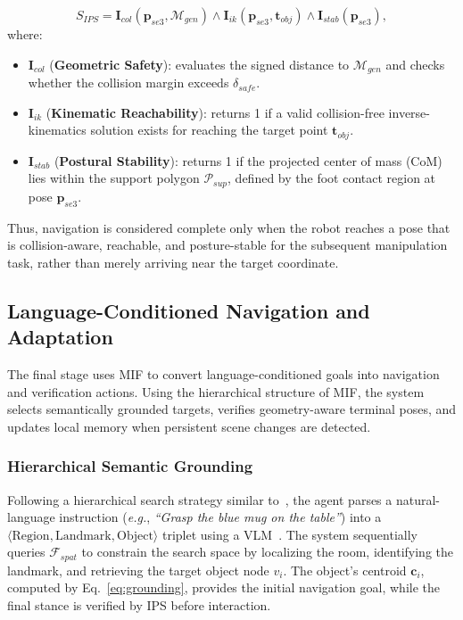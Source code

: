 \documentclass[conference]{IEEEtran}
\begin{document}
\begin{equation}
    S_{IPS} = \mathbf{I}_{col}(\mathbf{p}_{se3}, \mathcal{M}_{gen}) \land \mathbf{I}_{ik}(\mathbf{p}_{se3}, \mathbf{t}_{obj}) \land \mathbf{I}_{stab}(\mathbf{p}_{se3}) ,
\end{equation}
where:
\begin{itemize}
    \item $\mathbf{I}_{col}$ (\textbf{Geometric Safety}): evaluates the signed distance to $\mathcal{M}_{gen}$ and checks whether the collision margin exceeds $\delta_{safe}$.
    \item $\mathbf{I}_{ik}$ (\textbf{Kinematic Reachability}): returns 1 if a valid collision-free inverse-kinematics solution exists for reaching the target point $\mathbf{t}_{obj}$.
    \item $\mathbf{I}_{stab}$ (\textbf{Postural Stability}): returns 1 if the projected center of mass (CoM) lies within the support polygon $\mathcal{P}_{sup}$, defined by the foot contact region at pose $\mathbf{p}_{se3}$.
\end{itemize}
%
Thus, navigation is considered complete only when the robot reaches a pose that is collision-aware, reachable, and posture-stable for the subsequent manipulation task, rather than merely arriving near the target coordinate.



\subsection{Language-Conditioned Navigation and Adaptation}
\label{sec:navigation}
%
The final stage uses MIF to convert language-conditioned goals into navigation and verification actions.
%
Using the hierarchical structure of MIF, the system selects semantically grounded targets, verifies geometry-aware terminal poses, and updates local memory when persistent scene changes are detected.



\subsubsection{Hierarchical Semantic Grounding}
%
%
Following a hierarchical search strategy similar to~\cite{Werby-RSS-24}, the agent parses a natural-language instruction (\emph{e.g.}, \textit{``Grasp the blue mug on the table''}) into a $\langle \text{Region}, \text{Landmark}, \text{Object} \rangle$ triplet using a VLM~\cite{hurst2024gpt}.
%
The system sequentially queries $\mathcal{F}_{spat}$ to constrain the search space by localizing the room, identifying the landmark, and retrieving the target object node $v_i$.
%
The object's centroid $\mathbf{c}_i$, computed by Eq.~\ref{eq:grounding}, provides the initial navigation goal, while the final stance is verified by IPS before interaction.
\end{document}
